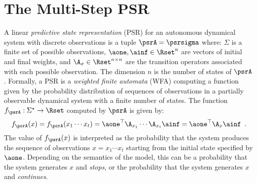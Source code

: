 \section{The Multi-Step PSR}

A linear \emph{predictive state representation} (PSR) for an autonomous dynamical system with discrete observations is a tuple $\psrA = \psrsigma$ where: $\Sigma$ is a finite set of possible observations, $\aone, \ainf \in \Rset^n$ are vectors of initial and final weights, and $\A_\sigma \in \Rset^{n \times n}$ are the transition operators associated with each possible observation. The dimension $n$ is the number of states of $\psrA$. Formally, a PSR is a \emph{weighted finite automata} (WFA) \cite{wfahandbook} computing a function given by the probability distribution of sequences of observations in a partially observable dynamical system with a finite number of states. The function $f_{\psrA} : \Sigma^\star \to \Rset$ computed by $\psrA$ is given by:
\begin{equation*}
f_{\psrA}(x) = f_{\psrA}(x_1 \cdots x_t) = \aone^\top \A_{x_1} \cdots \A_{x_t} \ainf = \aone^\top \A_x \ainf \enspace.
\end{equation*}
%
%
The value of $f_{\psrA}(x)$ is interpreted as the probability that the system produces the sequence of observations $x = x_1 \cdots x_t$ starting from the initial state specified by $\aone$. Depending on the semantics of the model, this can be a probability that the system generates $x$ and \emph{stops}, or the probability that the system generates $x$ and \emph{continues}.
